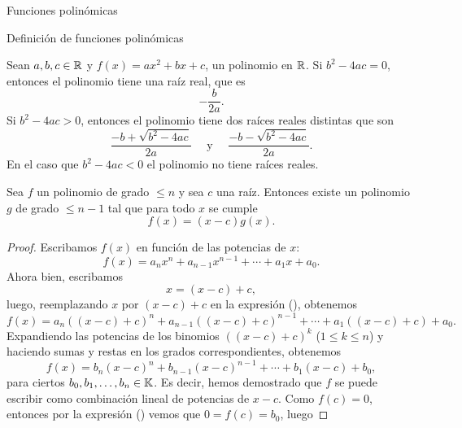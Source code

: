 \begin{chapter}{Funciones polinómicas}
\begin{section}{Definición de funciones polinómicas}
  \begin{ejemplo*}
      Sean $a,b,c \in \mathbb R$ y  $f(x) = ax^2 + bx + c$, un polinomio en $\mathbb R$.  Si $b^2 - 4 ac = 0$, entonces el polinomio tiene una raíz real, que es
      \begin{equation*}
          -\frac{b}{2a}.
      \end{equation*}
      Si $b^2 - 4 ac > 0$, entonces el polinomio tiene dos raíces reales distintas que son
      \begin{equation*}
          \frac{-b + \sqrt{b^2 - 4 ac}}{2a}\quad \text{ y }\quad \frac{-b - \sqrt{b^2 - 4 ac}}{2a}.
      \end{equation*}
      En el caso que $b^2 - 4 ac < 0$ el polinomio no tiene raíces reales.
  \end{ejemplo*}

  \begin{teorema}\label{th-fact-raiz}
      Sea $f$ un polinomio de grado $\le n$ y sea $c$ una raíz. Entonces existe un polinomio $g$ de grado $\le n - 1$ tal que para todo $x$ se cumple
      \begin{equation*}
          f (x) = (x - c) g (x).
      \end{equation*}
  \end{teorema}
  \begin{proof} Escribamos $f(x)$ en función de las potencias de  $x$:
      \begin{equation}\label{eq-funcion-polinomica-2}
          f(x) = a_nx^n + a_{n-1}x^{n-1}+\cdots + a_1x +a_0.
      \end{equation}
      Ahora bien,  escribamos
      \begin{equation*}
          x = (x-c)+ c,
      \end{equation*}
      luego, reemplazando $x$ por $(x-c)+ c$ en la expresión (), obtenemos
      \begin{equation*}
          f(x) = a_n((x-c)+ c)^n + a_{n-1}((x-c)+ c)^{n-1}+\cdots + a_1((x-c)+ c) +a_0.
      \end{equation*}
      Expandiendo las potencias de los binomios $((x-c)+ c)^k$ ($1 \le k \le n$) y haciendo sumas y restas en los grados correspondientes,  obtenemos
      \begin{equation}\label{eq-funcion-polinomica-3}
          f(x) = b_n(x-c)^n + b_{n-1}(x-c)^{n-1}+\cdots + b_1(x-c) +b_0,
      \end{equation}
      para ciertos $b_0, b_1,\ldots ,b_n \in \mathbb K$. Es decir,  hemos demostrado que $f$ se puede escribir como combinación lineal de potencias de $x-c$. Como $f(c) = 0$,  entonces por la expresión () vemos que  $0=f(c)=b_0$,  luego

\end{proof}
\end{section}
\end{chapter}
